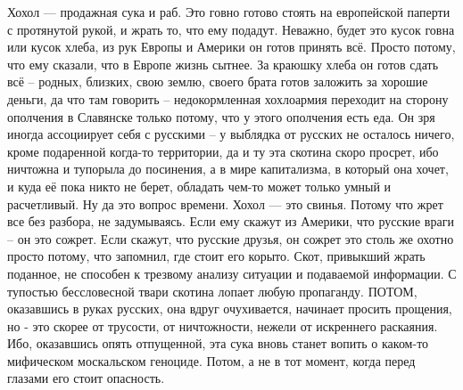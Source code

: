 Хохол — продажная сука и раб.
Это говно готово стоять на европейской паперти с протянутой рукой, и жрать то, что ему подадут. Неважно, будет это кусок говна или кусок хлеба, из рук Европы и Америки он готов принять всё. Просто потому, что ему сказали, что в Европе жизнь сытнее. За краюшку хлеба он готов сдать всё – родных, близких, свою землю, своего брата готов заложить за хорошие деньги, да что там говорить – недокормленная хохлоармия переходит на сторону ополчения в Славянске только потому, что у этого ополчения есть еда. Он зря иногда ассоциирует себя с русскими – у выблядка от русских не осталось ничего, кроме подаренной когда-то территории, да и ту эта скотина скоро просрет, ибо ничтожна и тупорыла до посинения, а в мире капитализма, в который она хочет, и куда её пока никто не берет, обладать чем-то может только умный и расчетливый. Ну да это вопрос времени.
Хохол — это свинья.
Потому что жрет все без разбора, не задумываясь. Если ему скажут из Америки, что русские враги – он это сожрет. Если скажут, что русские друзья, он сожрет это столь же охотно просто потому, что запомнил, где стоит его корыто. Скот, привыкший жрать поданное, не способен к трезвому анализу ситуации и подаваемой информации. С тупостью бессловесной твари скотина лопает любую пропаганду. ПОТОМ, оказавшись в руках русских, она вдруг очухивается, начинает просить прощения, но - это скорее от трусости, от ничтожности, нежели от искреннего раскаяния. Ибо, оказавшись опять отпущенной, эта сука вновь станет вопить о каком-то мифическом москальском геноциде. Потом, а не в тот момент, когда перед глазами его стоит опасность.

